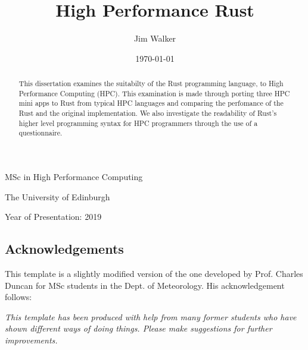 \documentclass[12pt,a4paper]{report}
\begin{document}





\title{High Performance Rust}
\author{Jim Walker}
\date{\today}

\makeEPCCtitle

\thispagestyle{empty}

\vspace{12cm}

\begin{center}

\large{MSc in High Performance Computing}

\large{The University of Edinburgh}

\large{Year of Presentation: 2019}

\end{center}

\newpage

\begin{abstract}
This dissertation examines the suitabilty of the Rust programming language, to High Performance Computing (HPC). This examination is made through porting three HPC mini apps to Rust from typical HPC languages and comparing the perfomance of the Rust and the original implementation. We also investigate the readability of Rust's higher level programming syntax for HPC programmers through the use of a questionnaire.
\end{abstract}


\tableofcontents
\listoftables
\listoffigures
\lstlistoflistings

\begin{titlepage}
\vspace*{2in}
\section*{Acknowledgements}

This template is a slightly modified version of the one developed by
Prof. Charles Duncan for MSc students in the Dept. of Meteorology. His
acknowledgement follows:

{\em This template has been produced with help from many former students who
have shown different ways of doing things. Please make suggestions for
further improvements.}

\end{titlepage}
\end{document}
